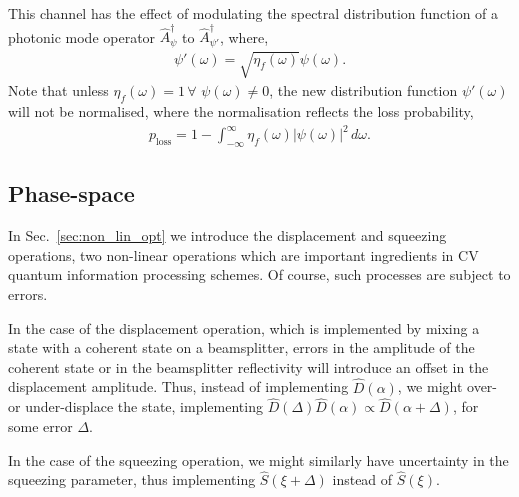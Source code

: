This channel has the effect of modulating the spectral distribution function of a photonic mode operator $\hat{A}_\psi^\dag$ to $\hat{A}_{\psi'}^\dag$, where,
\begin{align}
\psi'(\omega) = \sqrt{\eta_f(\omega)}\psi(\omega).	
\end{align}
Note that unless \mbox{$\eta_f(\omega)=1\,\forall\,\,\psi(\omega)\neq 0$}, the new distribution function $\psi'(\omega)$ will not be normalised, where the normalisation reflects the loss probability,
\begin{align}
p_\text{loss} = 1 - \int_{-\infty}^\infty \eta_f(\omega)|\psi(\omega)|^2\,d\omega.
\end{align}

%
%

\subsection{Phase-space} 

In Sec.~\ref{sec:non_lin_opt} we introduce the displacement and squeezing operations, two non-linear operations which are important ingredients in CV quantum information processing schemes. Of course, such processes are subject to errors.

In the case of the displacement operation, which is implemented by mixing a state with a coherent state on a beamsplitter, errors in the amplitude of the coherent state or in the beamsplitter reflectivity will introduce an offset in the displacement amplitude. Thus, instead of implementing $\hat{D}(\alpha)$, we might over- or under-displace the state, implementing \mbox{$\hat{D}(\Delta)\hat{D}(\alpha)\propto \hat{D}(\alpha+\Delta)$}, for some error $\Delta$.

In the case of the squeezing operation, we might similarly have uncertainty in the squeezing parameter, thus implementing $\hat{S}(\xi+\Delta)$ instead of $\hat{S}(\xi)$.